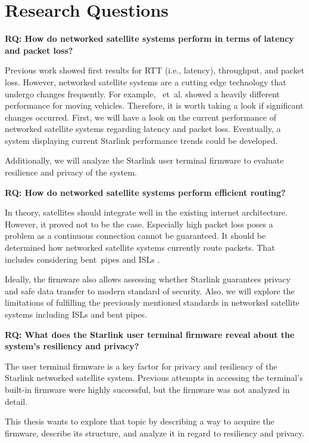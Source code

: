 \section{Research Questions} \label{sec:research-questions}

\begin{mdframed}
	\textbf{RQ: How do networked satellite systems perform in terms of latency and packet loss?}
\end{mdframed}

Previous work \cite{DBLP:conf/imc/MichelTGB22, DBLP:conf/infocom/MaCZCML23, Segan2020} showed first results for \ac{RTT} (i.e., latency), throughput, and packet loss. However, networked satellite systems are a cutting edge technology that undergo changes frequently. For example, \cite{DBLP:journals/corr/abs-2403-13497}~et~al. showed a heavily different performance for moving vehicles.
Therefore, it is worth taking a look if significant changes occurred. First, we will have a look on the current performance of networked satellite systems regarding latency and packet loss. Eventually, a system displaying current Starlink performance trends could be developed.

Additionally, we will analyze the Starlink user terminal firmware to evaluate resilience and privacy of the system.

\begin{mdframed}
	\textbf{RQ: How do networked satellite systems perform efficient routing?}
\end{mdframed}

In theory, satellites should integrate well in the existing internet architecture. However, it proved not to be the case. Especially high packet loss \cite{DBLP:conf/infocom/MaCZCML23} poses a problem as a continuous connection cannot be guaranteed.
It should be determined how networked satellite systems currently route packets. That includes considering bent~pipes and ISLs \cite{Hauri2020}.

Ideally, the firmware also allows assessing whether Starlink guarantees privacy and safe data transfer to modern standard of security.
Also, we will explore the limitations of fulfilling the previously mentioned standards in networked satellite systems including \ac{ISLs} and bent pipes.

\begin{mdframed}
	\textbf{RQ: What does the Starlink user terminal firmware reveal about the system's resiliency and privacy?}
\end{mdframed}

The user terminal firmware is a key factor for privacy and resiliency of the Starlink networked satellite system.
Previous attempts in accessing the terminal's built-in firmware were highly successful, but the firmware was not analyzed in detail.

This thesis wants to explore that topic by describing a way to acquire the firmware, describe its structure, and analyze it in regard to resiliency and privacy.

